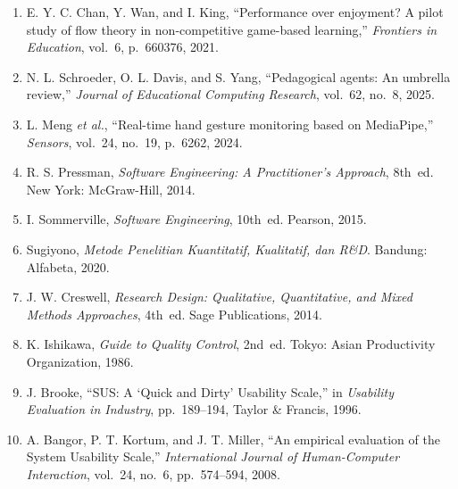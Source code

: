 \documentclass[10pt,twoside,openright]{report}
\begin{document}
\begin{enumerate}
    \item[{[13]}] E. Y. C. Chan, Y. Wan, and I. King, ``Performance over enjoyment? A pilot study of flow theory in non-competitive game-based learning,'' \textit{Frontiers in Education}, vol.~6, p.~660376, 2021.
    \item[{[14]}] N. L. Schroeder, O. L. Davis, and S. Yang, ``Pedagogical agents: An umbrella review,'' \textit{Journal of Educational Computing Research}, vol.~62, no.~8, 2025.
    \item[{[15]}] L. Meng \textit{et al.}, ``Real-time hand gesture monitoring based on MediaPipe,'' \textit{Sensors}, vol.~24, no.~19, p.~6262, 2024.
    \item[{[16]}] R. S. Pressman, \textit{Software Engineering: A Practitioner's Approach}, 8th~ed. New York: McGraw-Hill, 2014.
    \item[{[17]}] I. Sommerville, \textit{Software Engineering}, 10th~ed. Pearson, 2015.
    \item[{[18]}] Sugiyono, \textit{Metode Penelitian Kuantitatif, Kualitatif, dan R\&D}. Bandung: Alfabeta, 2020.
    \item[{[19]}] J. W. Creswell, \textit{Research Design: Qualitative, Quantitative, and Mixed Methods Approaches}, 4th~ed. Sage Publications, 2014.
    \item[{[20]}] K. Ishikawa, \textit{Guide to Quality Control}, 2nd~ed. Tokyo: Asian Productivity Organization, 1986.
    \item[{[21]}] J. Brooke, ``SUS: A `Quick and Dirty' Usability Scale,'' in \textit{Usability Evaluation in Industry}, pp.~189--194, Taylor \& Francis, 1996.
    \item[{[22]}] A. Bangor, P. T. Kortum, and J. T. Miller, ``An empirical evaluation of the System Usability Scale,'' \textit{International Journal of Human-Computer Interaction}, vol.~24, no.~6, pp.~574--594, 2008.
\end{enumerate}
\end{document}
